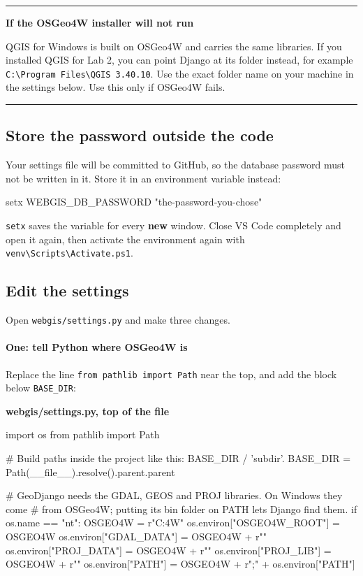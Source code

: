 \documentclass{article}
\newcommand{\cd}[1]{\texttt{#1}}
\newcommand{\codecap}[1]{%
  \par\vspace{.9em}\noindent\textbf{#1}\par\vspace{-.6em}}
\newenvironment{keypoint}[1]
  {\par\vspace{.7em}\noindent\rule{\linewidth}{.6pt}\par\vspace{.15em}
   \noindent\textbf{#1}\par\nobreak\vspace{-.3em}}
  {\par\vspace{.15em}\noindent\rule{\linewidth}{.6pt}\par\vspace{.7em}}
\begin{document}
\begin{keypoint}{If the OSGeo4W installer will not run}
QGIS for Windows is built on OSGeo4W and carries the same libraries. If
you installed QGIS for Lab 2, you can point Django at its folder instead,
for example \cd{C:\textbackslash Program Files\textbackslash QGIS 3.40.10}.
Use the exact folder name on your machine in the settings below. Use this
only if OSGeo4W fails.
\end{keypoint}

\subsection{Store the password outside the code}

Your settings file will be committed to GitHub, so the database password
must not be written in it. Store it in an environment variable instead:

\begin{code}
setx WEBGIS_DB_PASSWORD "the-password-you-chose"
\end{code}

\cd{setx} saves the variable for every \textbf{new} window. Close VS Code
completely and open it again, then activate the environment again with
\cd{venv\textbackslash Scripts\textbackslash Activate.ps1}.

\subsection{Edit the settings}

Open \cd{webgis/settings.py} and make three changes.

\paragraph{One: tell Python where OSGeo4W is}
Replace the line \cd{from pathlib import Path} near the top, and add the
block below \cd{BASE\_DIR}:

\codecap{webgis/settings.py, top of the file}
\begin{code}
import os
from pathlib import Path

# Build paths inside the project like this: BASE_DIR / 'subdir'.
BASE_DIR = Path(__file__).resolve().parent.parent

# GeoDjango needs the GDAL, GEOS and PROJ libraries. On Windows they come
# from OSGeo4W; putting its bin folder on PATH lets Django find them.
if os.name == "nt":
    OSGEO4W = r"C:\OSGeo4W"
    os.environ["OSGEO4W_ROOT"] = OSGEO4W
    os.environ["GDAL_DATA"] = OSGEO4W + r"\share\gdal"
    os.environ["PROJ_DATA"] = OSGEO4W + r"\share\proj"
    os.environ["PROJ_LIB"] = OSGEO4W + r"\share\proj"
    os.environ["PATH"] = OSGEO4W + r"\bin;" + os.environ["PATH"]
\end{code}
\end{document}
